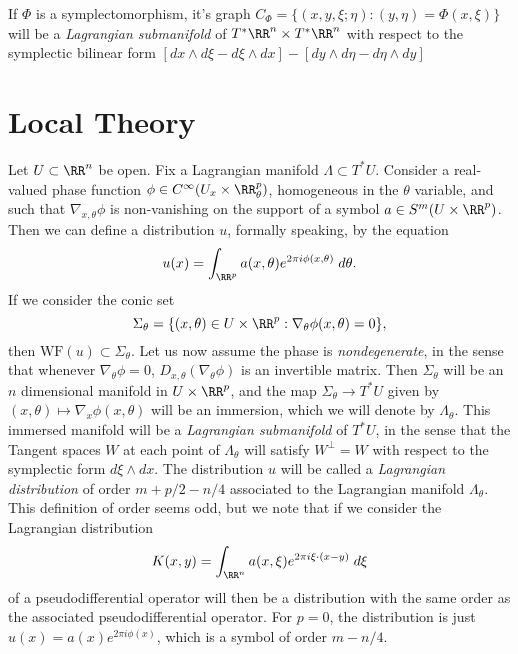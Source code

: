 If $\Phi$ is a symplectomorphism, it's graph $C_\Phi = \{ (x,y,\xi;\eta) : (y,\eta) = \Phi(x,\xi) \}$ will be a \emph{Lagrangian submanifold} of $T^* \RR^n \times T^* \RR^n$ with respect to the symplectic bilinear form $[dx \wedge d\xi - d\xi \wedge dx] - [dy \wedge d\eta -d\eta \wedge dy]$

\section{Local Theory}

Let $U \subset \RR^n$ be open. Fix a Lagrangian manifold $\Lambda \subset T^* U$. Consider a real-valued phase function $\phi \in C^\infty(U_x \times \RR^p_\theta)$, homogeneous in the $\theta$ variable, and such that $\nabla_{x,\theta} \phi$ is non-vanishing on the support of a symbol $a \in S^m(U \times \RR^p)$. Then we can define a distribution $u$, formally speaking, by the equation
%
\[ u(x) = \int_{\RR^p} a(x,\theta) e^{2 \pi i \phi(x,\theta)}\; d\theta. \]
%
If we consider the conic set
%
\[ \Sigma_\theta = \{ (x,\theta) \in U \times \RR^p : \nabla_\theta \phi(x,\theta) = 0 \}, \]
%
then $\text{WF}(u) \subset \Sigma_\theta$. Let us now assume the phase is \emph{nondegenerate}, in the sense that whenever $\nabla_\theta \phi = 0$, $D_{x,\theta} (\nabla_\theta \phi)$ is an invertible matrix. Then $\Sigma_\theta$ will be an $n$ dimensional manifold in $U \times \RR^p$, and the map $\Sigma_\theta \to T^* U$ given by $(x,\theta) \mapsto \nabla_x \phi(x,\theta)$ will be an immersion, which we will denote by $\Lambda_\theta$. This immersed manifold will be a \emph{Lagrangian submanifold} of $T^* U$, in the sense that the Tangent spaces $W$ at each point of $\Lambda_\theta$ will satisfy $W^\perp = W$ with respect to the symplectic form $d\xi \wedge dx$. The distribution $u$ will be called a \emph{Lagrangian distribution} of order $m + p/2 - n/4$ associated to the Lagrangian manifold $\Lambda_\theta$. This definition of order seems odd, but we note that if we consider the Lagrangian distribution
%
\[ K(x,y) = \int_{\RR^n} a(x,\xi) e^{2 \pi i \xi \cdot (x - y)}\; d\xi \]
%
of a pseudodifferential operator will then be a distribution with the same order as the associated pseudodifferential operator. For $p = 0$, the distribution is just $u(x) = a(x) e^{2 \pi i \phi(x)}$, which is a symbol of order $m - n/4$.














